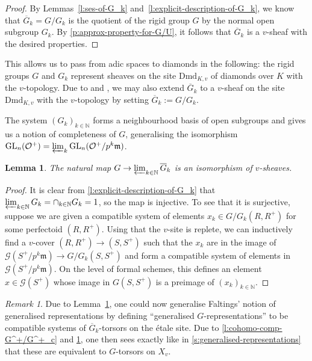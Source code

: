 \documentclass[11pt]{amsart}
\numberwithin{equation}{section}
\newtheorem{Lemma}[thm]{Lemma}
\theoremstyle{definition}
\theoremstyle{remark}
\newtheorem{Remark}[thm]{Remark}
\newcommand{\N}{\mathbb{N}}
\renewcommand{\O}{\mathcal{O}}
\newcommand{\m}{\mathfrak{m}}
\newcommand{\GL}{\operatorname{GL}}
\newcommand{\mG}{\mathcal{G}}
\newcommand{\Dmd}{\mathrm{Dmd}}
\begin{document}
\begin{proof}
	By Lemmas~\ref{l:ses-of-G_k} and~\ref{l:explicit-description-of-G_k}, we know that $\overline G_k=G/G_k$ is the quotient of the rigid group $G$ by the normal open subgroup $G_k$. By \cref{p:approx-property-for-G/U}, it follows that $\overline G_k$ is a $v$-sheaf with the desired properties.
\end{proof}

This allows us to pass from adic spaces to diamonds in the following: the rigid groups $G$ and $G_k$ represent sheaves on the site $\Dmd_{K,v}$ of diamonds over $K$ with the $v$-topology.
Due to  and , we may also extend $\overline{G}_k$ to a $v$-sheaf on the site $\Dmd_{K,v}$ with the $v$-topology by setting $\overline{G}_k:=G/G_k$.

The system $(G_k)_{k\in \N}$ forms a neighbourhood basis of  open subgroups and gives us a notion of completeness of $G$, generalising the isomorphism $\GL_n(\O^+)=\varprojlim_k \GL_n(\O^+/p^k\m)$. 

\begin{Lemma}\label{l:G^+-complete}
	The natural map $ G\to\varprojlim_{k\in \N} \overline{G}_{k}$
	is an isomorphism of $v$-sheaves.
\end{Lemma}

\begin{proof}
	It is clear from \cref{l:explicit-description-of-G_k} that $\varprojlim_{k\in \N} G_k=\cap_{k\in \N} G_k=1$, so the map is injective. To see that it is surjective, suppose we are given a compatible system of elements $x_k\in G/G_k(R,R^+)$ for some perfectoid $(R,R^+)$. Using that the $v$-site is replete, we can inductively find a $v$-cover $(R,R^+)\to (S,S^+)$ such that the $x_k$ are in the image of $\mG(S^+/p^k\m)\to G/G_k(S,S^+)$ and form a compatible system of elements in $\mG(S^+/p^k\m)$. On the level of formal schemes, this defines an element $x\in\mG(S^+)$ whose image in $G(S,S^+)$ is a preimage of $(x_k)_{k\in \N}$.
\end{proof}

\begin{Remark}
	Due to Lemma~\ref{l:G^+-complete}, one could now generalise Faltings' notion of generalised representations by defining ``generalised $G$-representations'' to be compatible systems of $\overline G_{k}$-torsors on the \'etale site. Due to \cref{l:cohomo-comp-G^+/G^+_c} and \cref{l:G^+-complete}, one then sees exactly like in \cref{s:generalised-representations} that these are equivalent to $G$-torsors on $X_v$.
\end{Remark}
\end{document}
